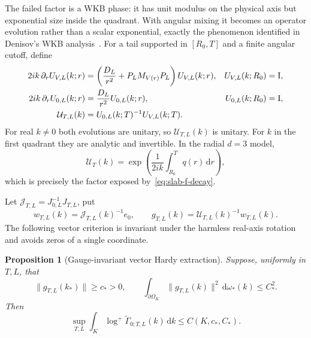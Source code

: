 \documentclass[11pt]{article}
\newcommand{\Id}{\mathrm I}
\newcommand{\dd}{\,\mathrm d}
\newtheorem{proposition}[theorem]{Proposition}
\theoremstyle{definition}
\theoremstyle{remark}
\begin{document}
The failed factor is a WKB phase: it has unit modulus on the physical axis but exponential size inside the quadrant.  With angular mixing it becomes an operator evolution rather than a scalar exponential, exactly the phenomenon identified in Denisov's WKB analysis~\cite{DenisovWKB2009}.  For a tail supported in $[R_0,T]$ and a finite angular cutoff, define
\begin{align}
 2ik\,\partial_rU_{V,L}(k;r)&=
 \left(\frac{D_L}{r^2}+P_LM_{V(r)}P_L\right)U_{V,L}(k;r),
 &U_{V,L}(k;R_0)&=\Id,\notag\\
 2ik\,\partial_rU_{0,L}(k;r)&=\frac{D_L}{r^2}U_{0,L}(k;r),
 &U_{0,L}(k;R_0)&=\Id,
 \label{eq:forward-wkb-evolution}\\
 \mathcal U_{T,L}(k)&=
 U_{0,L}(k;T)^{-1}U_{V,L}(k;T).
 \label{eq:relative-wkb-gauge}
\end{align}
For real $k\ne0$ both evolutions are unitary, so $\mathcal U_{T,L}(k)$ is unitary.  For $k$ in the first quadrant they are analytic and invertible.  In the radial $d=3$ model,
\begin{equation}
 \mathcal U_T(k)=
 \exp\!\left(\frac1{2ik}\int_{R_0}^Tq(r)\dd r\right),
 \label{eq:scalar-wkb-gauge}
\end{equation}
which is precisely the factor exposed by~\eqref{eq:slab-f-decay}.

Let $\mathcal J_{T,L}=J_{0,L}^{-1}J_{T,L}$, put
\begin{equation}
 w_{T,L}(k)=\mathcal J_{T,L}(k)^{-1}e_0,
 \qquad
 g_{T,L}(k)=\mathcal U_{T,L}(k)^{-1}w_{T,L}(k).
 \label{eq:gauged-radiation-column}
\end{equation}
The following vector criterion is invariant under the harmless real-axis rotation and avoids zeros of a single coordinate.

\begin{proposition}[Gauge-invariant vector Hardy extraction]\label{prop:gauged-vector-hardy}
Suppose, uniformly in $T,L$, that
\begin{equation}
 \|g_{T,L}(k_*)\|\geq c_*>0,
 \qquad
 \int_{\partial\Omega_K}\|g_{T,L}(k)\|^2\dd\omega_*(k)
 \leq C_*^2.
 \label{eq:GVH1}
\end{equation}
Then
\begin{equation}
 \sup_{T,L}\int_K\log^+\widetilde\Gamma_{0;T,L}(k)\dd k
 \leq C(K,c_*,C_*).
 \label{eq:gauged-vector-entropy}
\end{equation}
\end{proposition}
\end{document}
